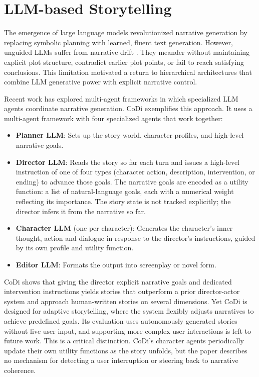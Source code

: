 \section{LLM-based Storytelling}\label{sec:rw-llm-story}

The emergence of large language models revolutionized narrative generation by replacing symbolic planning with learned, fluent text generation. However, unguided LLMs suffer from narrative drift \cite{yang2023doc}. They meander without maintaining explicit plot structure, contradict earlier plot points, or fail to reach satisfying conclusions. This limitation motivated a return to hierarchical architectures that combine LLM generative power with explicit narrative control.


Recent work has explored multi-agent frameworks in which specialized LLM agents coordinate narrative generation.
CoDi \cite{kim2025codi} exemplifies this approach. It uses a multi-agent framework with four specialized agents that work together:

\begin{itemize}
    \item \textbf{Planner LLM}: Sets up the story world, character profiles, and high-level narrative goals.
    \item \textbf{Director LLM}: Reads the story so far each turn and issues a high-level instruction of one of four types (character action, description, intervention, or ending) to advance those goals.
    The narrative goals are encoded as a utility function: a list of natural-language goals, each with a numerical weight reflecting its importance. The story state is not tracked explicitly; the director infers it from the narrative so far.
    \item \textbf{Character LLM} (one per character): Generates the character's inner thought, action and dialogue in response to the director's instructions, guided by its own profile and utility function.
    \item \textbf{Editor LLM}: Formats the output into screenplay or novel form.
\end{itemize}

CoDi shows that giving the director explicit narrative goals and dedicated intervention instructions yields stories that outperform a prior director-actor system and approach human-written stories on several dimensions. Yet CoDi is designed for adaptive storytelling, where the system flexibly adjusts narratives to achieve predefined goals. Its evaluation uses autonomously generated stories without live user input, and supporting more complex user interactions is left to future work. This is a critical distinction. CoDi's character agents periodically update their own utility functions as the story unfolds, but the paper describes no mechanism for detecting a user interruption or steering back to narrative coherence.

